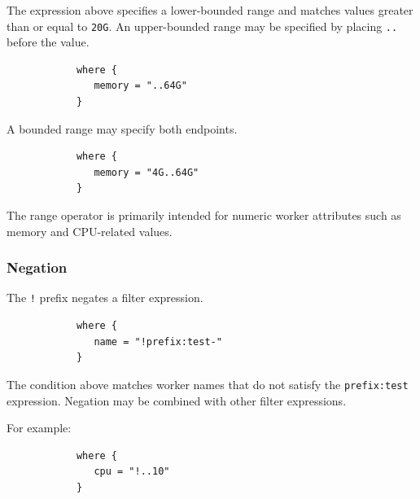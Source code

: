\documentclass[11pt,a4paper]{article}
\begin{document}
    The expression above specifies a lower-bounded range and matches values greater than or equal to \texttt{20G}.
    An upper-bounded range may be specified by placing \texttt{\string.\string.} before the value.

    \begin{center}
        \begin{verbatim}
            where {
               memory = "..64G"
            }
        \end{verbatim}
    \end{center}

    A bounded range may specify both endpoints.

    \begin{center}
        \begin{verbatim}
            where {
               memory = "4G..64G"
            }
        \end{verbatim}
    \end{center}

    The range operator is primarily intended for numeric worker attributes such as memory and CPU-related values.

    \subsubsection{Negation}

    The \texttt{!} prefix negates a filter expression.

    \begin{center}
        \begin{verbatim}
            where {
               name = "!prefix:test-"
            }
        \end{verbatim}
    \end{center}

    The condition above matches worker names that do not satisfy the \texttt{prefix:test} expression.
    Negation may be combined with other filter expressions.

    For example:

    \begin{center}
        \begin{verbatim}
            where {
               cpu = "!..10"
            }
        \end{verbatim}
    \end{center}
\end{document}
